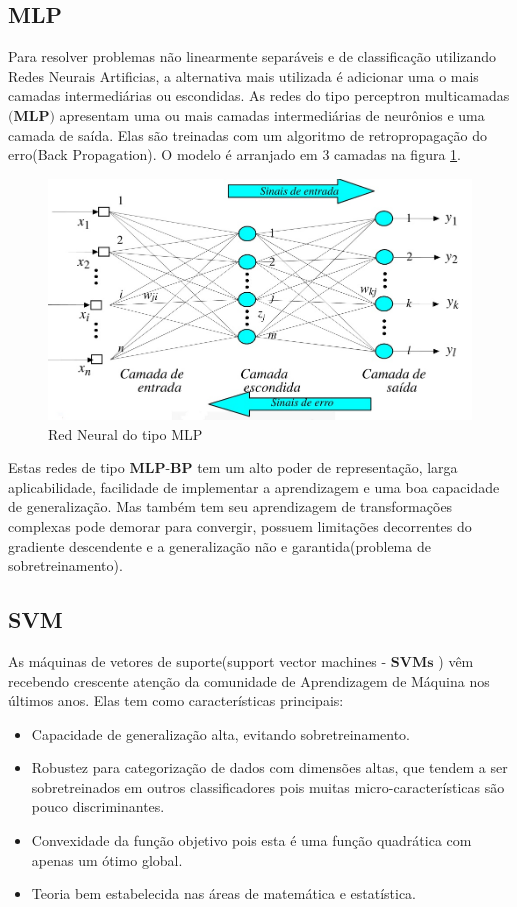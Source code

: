 \documentclass[12pt]{article}
\begin{document}
\subsection{MLP}
Para resolver problemas não linearmente separáveis e de classificação utilizando Redes Neurais Artificias, a alternativa mais utilizada é adicionar uma o mais camadas intermediárias ou escondidas. As redes do tipo perceptron multicamadas $\textbf{(MLP)}$ apresentam uma ou mais camadas intermediárias de neurônios e uma camada de saída. Elas são treinadas com um algoritmo de retropropagação do erro(Back Propagation).
O modelo é arranjado em 3 camadas na figura \ref{fig:mlp}.


\begin{figure}[h]
\centering
\includegraphics[width=4.5in]{../out/mlp.jpg}
\caption{Red Neural do tipo MLP}
\label{fig:mlp}
\end{figure} 

Estas redes de tipo $\textbf{MLP-BP}$ tem um alto poder de representação, larga aplicabilidade, facilidade de implementar a aprendizagem e uma boa capacidade de generalização. Mas também tem seu aprendizagem de transformações complexas pode demorar para convergir, possuem limitações decorrentes do gradiente descendente e a generalização não e garantida(problema de sobretreinamento).
\subsection{SVM}
As máquinas de vetores de suporte(support vector machines - $\textbf{SVMs}$ ) vêm recebendo crescente atenção da comunidade de Aprendizagem de Máquina nos últimos anos. Elas tem como características principais:
\begin{itemize}
    \item Capacidade de generalização alta, evitando sobretreinamento.
    \item Robustez para categorização de dados com dimensões altas, que tendem a ser sobretreinados em outros classificadores pois muitas micro-características são pouco discriminantes.
    \item Convexidade da função objetivo pois esta é uma função quadrática com apenas um ótimo global. 
    \item Teoria bem estabelecida nas áreas de matemática e estatística.
\end{itemize}
\end{document}
